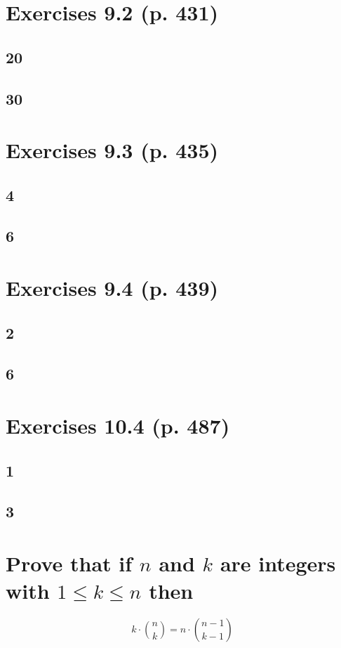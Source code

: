 \documentclass[a4paper]{article}
\begin{document}
\section{Exercises 9.2 (p. 431) }
\subsection{20}
\subsection{30}

\section{Exercises 9.3 (p. 435)  }
\subsection{4}
\subsection{6}

\section{Exercises 9.4 (p. 439)  }
\subsection{2}
\subsection{6}

\section{Exercises 10.4 (p. 487) }
\subsection{1}
\subsection{3}

\section{Prove that if $n$ and $k$ are integers with $1\leq k \leq n$ then}
$$
k\cdot \binom{n}{k}=n\cdot \binom{n-1}{k-1}
$$
\end{document}
